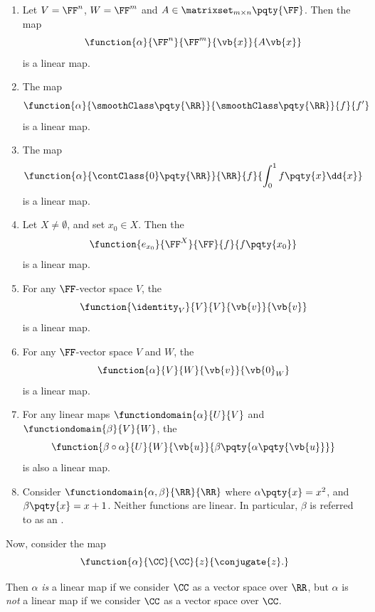 \begin{examples}
    \begin{enumerate}[label=(\alph*)]
        \item Let \(V = \FF^n\), \(W = \FF^m\) and \(A \in \matrixset_{m \times n} \pqty{\FF}\). Then the map
        \[
            \function{\alpha}{\FF^n}{\FF^m}{\vb{x}}{A \vb{x}}
        \]
        is a linear map.
        \item The map
        \[
            \function{\alpha}{\smoothClass\pqty{\RR}}{\smoothClass\pqty{\RR}}{f}{f'}
        \]
        is a linear map.
        \item The map
        \[
            \function{\alpha}{\contClass{0}\pqty{\RR}}{\RR}{f}{\int_{0}^{1} f \pqty{x} \dd{x}}
        \]
        is a linear map.
        \item Let \(X \neq \emptyset\), and set \(x_0 \in X\). Then the 
        \[
            \function{e_{x_0}}{\FF^X}{\FF}{f}{f \pqty{x_0}}
        \]
        is a linear map.
        \item For any \(\FF\)-vector space \(V\), the 
        \[
            \function{\identity_V}{V}{V}{\vb{v}}{\vb{v}}
        \]
        is a linear map.
        \item For any \(\FF\)-vector space \(V\) and \(W\), the 
        \[
            \function{\alpha}{V}{W}{\vb{v}}{\vb{0}_{W}}
        \]
        is a linear map.
        \item For any linear maps \(\functiondomain{\alpha}{U}{V}\) and \(\functiondomain{\beta}{V}{W}\), the 
        \[
            \function{\beta \circ \alpha}{U}{W}{\vb{u}}{\beta \pqty{\alpha \pqty{\vb{u}}}}
        \]
        is also a linear map.
        \item Consider \(\functiondomain{\alpha, \beta}{\RR}{\RR}\) where \(\alpha\pqty{x} = x^2\), and \(\beta\pqty{x} = x + 1\). Neither functions are linear. In particular, \(\beta\) is referred to as an .
    \end{enumerate}
\end{examples}

\begin{example}
    Now, consider the map
    \[
        \function{\alpha}{\CC}{\CC}{z}{\conjugate{z}.}
    \]

    Then \(\alpha\) \emph{is} a linear map if we consider \(\CC\) as a vector space over \(\RR\), but \(\alpha\) is \emph{not} a linear map if we consider \(\CC\) as a vector space over \(\CC\).
\end{example}

